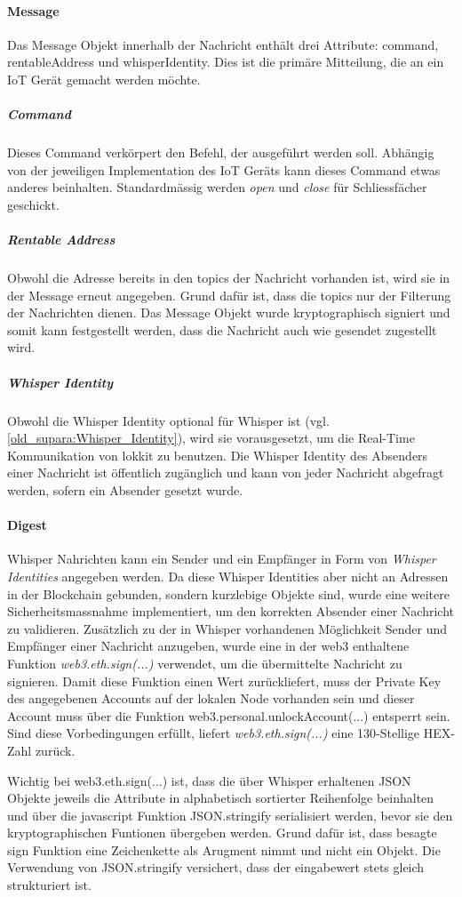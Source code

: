 \paragraph{Message}
Das Message Objekt innerhalb der Nachricht enthält drei Attribute: command, rentableAddress und whisperIdentity. Dies ist die primäre Mitteilung, die an ein IoT Gerät gemacht werden möchte.
\subparagraph{Command}
Dieses Command verkörpert den Befehl, der ausgeführt werden soll. Abhängig von der jeweiligen Implementation des IoT Geräts kann dieses Command etwas anderes beinhalten. Standardmässig werden \emph{open} und \emph{close} für Schliessfächer geschickt.
\subparagraph{Rentable Address}
Obwohl die Adresse bereits in den topics der Nachricht vorhanden ist, wird sie in der Message erneut angegeben. Grund dafür ist, dass die topics nur der Filterung der Nachrichten dienen. Das Message Objekt wurde kryptographisch signiert und somit kann festgestellt werden, dass die Nachricht auch wie gesendet zugestellt wird.
\subparagraph{Whisper Identity}
Obwohl die Whisper Identity optional für Whisper ist (vgl. \ref{old_supara:Whisper_Identity}), wird sie vorausgesetzt, um die Real-Time Kommunikation von lokkit zu benutzen. Die Whisper Identity des Absenders einer Nachricht ist öffentlich zugänglich und kann von jeder Nachricht abgefragt werden, sofern ein Absender gesetzt wurde.

\paragraph{Digest}
Whisper Nahrichten kann ein Sender und ein Empfänger in Form von \emph{Whisper Identities} angegeben werden. Da diese Whisper Identities aber nicht an Adressen in der Blockchain gebunden, sondern kurzlebige Objekte sind, wurde eine weitere Sicherheitsmassnahme implementiert, um den korrekten Absender einer Nachricht zu validieren.
Zusätzlich zu der in Whisper vorhandenen Möglichkeit Sender und Empfänger einer Nachricht anzugeben, wurde eine in der web3 enthaltene Funktion \emph{web3.eth.sign(...)} verwendet, um die übermittelte Nachricht zu signieren. Damit diese Funktion einen Wert zurückliefert, muss der Private Key des angegebenen Accounts auf der lokalen Node vorhanden sein und dieser Account muss über die Funktion web3.personal.unlockAccount(...) entsperrt sein. Sind diese Vorbedingungen erfüllt, liefert \emph{web3.eth.sign(...)} eine 130-Stellige HEX-Zahl zurück.

Wichtig bei web3.eth.sign(...) ist, dass die über Whisper erhaltenen JSON Objekte jeweils die Attribute in alphabetisch sortierter Reihenfolge beinhalten und über die javascript Funktion JSON.stringify serialisiert werden, bevor sie den kryptographischen Funtionen übergeben werden. Grund dafür ist, dass besagte sign Funktion eine Zeichenkette als Arugment nimmt und nicht ein Objekt. Die Verwendung von JSON.stringify versichert, dass der eingabewert stets gleich strukturiert ist.

